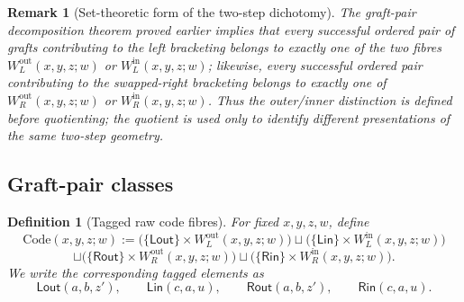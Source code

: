 \documentclass[11pt]{article}
\newtheorem{definition}[theorem]{Definition}
\newtheorem{remark}[theorem]{Remark}
\begin{document}
\begin{remark}[Set-theoretic form of the two-step dichotomy]
The graft-pair decomposition theorem proved earlier implies that every
successful ordered pair of grafts contributing to the left bracketing belongs
to exactly one of the two fibres \(W^{\mathrm{out}}_L(x,y,z;w)\) or
\(W^{\mathrm{in}}_L(x,y,z;w)\); likewise, every successful ordered pair
contributing to the swapped-right bracketing belongs to exactly one of
\(W^{\mathrm{out}}_R(x,y,z;w)\) or \(W^{\mathrm{in}}_R(x,y,z;w)\). Thus the
outer/inner distinction is defined before quotienting; the quotient is used
only to identify different presentations of the same two-step geometry.
\end{remark}

\subsection{Graft-pair classes}

\begin{definition}[Tagged raw code fibres]
For fixed \(x,y,z,w\), define
\[
\mathrm{Code}(x,y,z;w):=
\bigl(\{\mathsf{Lout}\}\times W^{\mathrm{out}}_L(x,y,z;w)\bigr)
\sqcup
\bigl(\{\mathsf{Lin}\}\times W^{\mathrm{in}}_L(x,y,z;w)\bigr)
\]
\[
\sqcup
\bigl(\{\mathsf{Rout}\}\times W^{\mathrm{out}}_R(x,y,z;w)\bigr)
\sqcup
\bigl(\{\mathsf{Rin}\}\times W^{\mathrm{in}}_R(x,y,z;w)\bigr).
\]
We write the corresponding tagged elements as
\[
\mathsf{Lout}(a,b,z'),\qquad
\mathsf{Lin}(c,a,u),\qquad
\mathsf{Rout}(a,b,z'),\qquad
\mathsf{Rin}(c,a,u).
\]
\end{definition}
\end{document}
